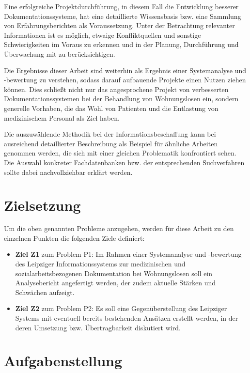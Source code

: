 Eine erfolgreiche Projektdurchführung, in diesem Fall die Entwicklung besserer Dokumentationssysteme, hat eine detaillierte Wissensbasis bzw. eine Sammlung von Erfahrungsberichten als Voraussetzung. Unter der Betrachtung relevanter Informationen ist es möglich, etwaige Konfliktquellen und sonstige Schwierigkeiten im Voraus zu erkennen und in der Planung, Durchführung und Überwachung mit zu berücksichtigen.

Die Ergebnisse dieser Arbeit sind weiterhin als Ergebnis einer Systemanalyse und -bewertung zu verstehen, sodass darauf aufbauende Projekte einen Nutzen ziehen können. Dies schließt nicht nur das angesprochene Projekt von verbesserten Dokumentationssystemen bei der Behandlung von Wohnungslosen ein, sondern generelle Vorhaben, die das Wohl von Patienten und die Entlastung von medizinischem Personal als Ziel haben.

Die auszuwählende Methodik bei der Informationsbeschaffung kann bei ausreichend detaillierter Beschreibung als Beispiel für ähnliche Arbeiten genommen werden, die sich mit einer gleichen Problematik konfrontiert sehen. Die Auswahl konkreter Fachdatenbanken bzw. der entsprechenden Suchverfahren sollte dabei nachvollziehbar erklärt werden.

\newpage

\section{Zielsetzung}\label{sec:zielsetzung}

Um die oben genannten Probleme anzugehen, werden für diese Arbeit zu den einzelnen Punkten die folgenden Ziele definiert:

\begin{itemize}
	\item \textbf{Ziel Z1} zum Problem P1: Im Rahmen einer Systemanalyse und -bewertung des Leipziger Informationssystems zur medizinischen und sozialarbeitsbezogenen Dokumentation bei Wohnungslosen soll ein Analysebericht angefertigt werden, der zudem aktuelle Stärken und Schwächen aufzeigt.
	\item \textbf{Ziel Z2} zum Problem P2: Es soll eine Gegenüberstellung des Leipziger Systems mit eventuell bereits bestehenden Ansätzen erstellt werden, in der deren Umsetzung bzw. Übertragbarkeit diskutiert wird.
\end{itemize}


\section{Aufgabenstellung}

